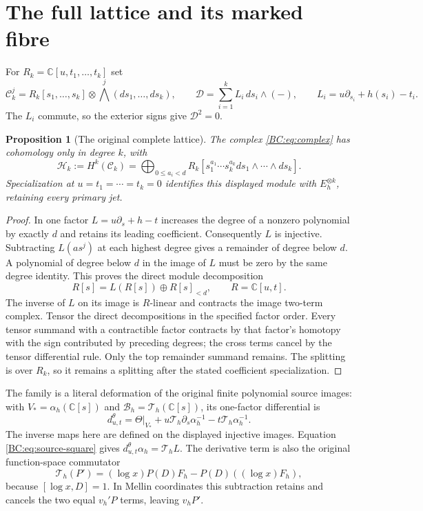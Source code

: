 \documentclass[11pt,a4paper]{article}
\newtheorem{proposition}[theorem]{Proposition}
\newcommand{\C}{\mathbb C}
\newcommand{\HH}{\mathcal H}
\newcommand{\BB}{\mathscr B}
\begin{document}
\section{The full lattice and its marked fibre}

For $R_k=\C[u,t_1,\ldots,t_k]$ set
\begin{equation}
 \mathcal C_k^j=R_k[s_1,\ldots,s_k]\otimes
                  \bigwedge^j(ds_1,\ldots,ds_k),\qquad
 \mathcal D=\sum_{i=1}^k L_i\,ds_i\wedge(-),\qquad
 L_i=u\partial_{s_i}+h(s_i)-t_i.
 \label{BC:eq:complex}
\end{equation}
The $L_i$ commute, so the exterior signs give $\mathcal D^2=0$.

\begin{proposition}[The original complete lattice]
The complex \eqref{BC:eq:complex} has cohomology only in degree $k$, with
\begin{equation}
 \HH_k:=H^k(\mathcal C_k)
   =\bigoplus_{0\le a_i<d}R_k
       [s_1^{a_1}\cdots s_k^{a_k}ds_1\wedge\cdots\wedge ds_k].
 \label{BC:eq:lattice}
\end{equation}
Specialization at $u=t_1=\cdots=t_k=0$ identifies this displayed
module with $E_h^{\otimes k}$, retaining every primary jet.
\end{proposition}
\begin{proof}
In one factor $L=u\partial_s+h-t$ increases the degree of a nonzero
polynomial by exactly $d$ and retains its leading coefficient.
Consequently $L$ is injective.  Subtracting $L(as^j)$ at each highest
degree gives a remainder of degree below $d$.  A polynomial of degree
below $d$ in the image of $L$ must be zero by the same degree identity.
This proves the direct module decomposition
\[
 R[s]=L(R[s])\oplus R[s]_{<d},\qquad R=\C[u,t].
\]
The inverse of $L$ on its image is $R$-linear and contracts the image
two-term complex.  Tensor the direct decompositions in the specified
factor order.  Every tensor summand with a contractible factor contracts
by that factor's homotopy with the sign contributed by preceding degrees;
the cross terms cancel by the tensor differential rule.  Only the top
remainder summand remains.  The splitting is over $R_k$, so it remains a
splitting after the stated coefficient specialization.
\end{proof}

The family is a literal deformation of the original finite polynomial
source images: with $V_* =\alpha_h(\C[s])$ and
$\BB_h=\mathcal T_h(\C[s])$, its one-factor differential is
\begin{equation}
 d^\theta_{u,t}=\Theta|_{V_*}
       +u\mathcal T_h\partial_s\alpha_h^{-1}
       -t\mathcal T_h\alpha_h^{-1}.
\end{equation}
The inverse maps here are defined on the displayed injective images.
Equation \eqref{BC:eq:source-square} gives
$d^\theta_{u,t}\alpha_h=\mathcal T_hL$.
The derivative term is also the original function-space commutator
\[
 \mathcal T_h(P')=(\log x)P(D)F_h-P(D)((\log x)F_h),
\]
because $[\log x,D]=1$.  In Mellin coordinates this subtraction
retains and cancels the two equal $v_h'P$ terms, leaving $v_hP'$.
\end{document}
